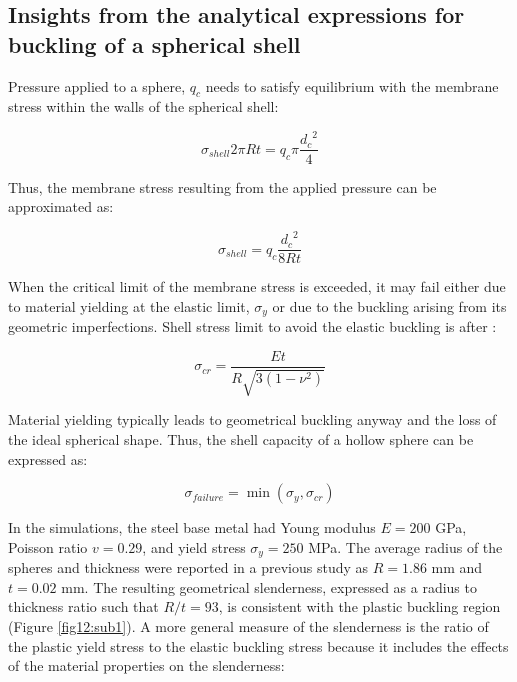 \documentclass[review]{elsarticle}
\begin{document}
{\subsection{Insights from the analytical expressions for buckling of a spherical shell}

Pressure applied to a sphere, $q_c$ needs to satisfy equilibrium with the membrane stress within the walls of the spherical shell:

\begin{equation}\label{Eq1}
\sigma_{shell}2\pi Rt=q_c\pi \frac{{d_c}^{2}}{4}
\end{equation}


Thus, the membrane stress resulting from the applied pressure can be approximated as:

\begin{equation}\label{Eq2}
\sigma_{shell}=q_c\frac{{d_c}^{2}}{8Rt}
\end{equation}

When the critical limit of the membrane stress is exceeded, it may fail either due to material yielding at the elastic limit, $\sigma_y$ or due to the buckling arising from its geometric imperfections. Shell stress limit to avoid the elastic buckling is after \cite{TimGer2009}:

\begin{equation}\label{Eq3}
\sigma_{cr}=\frac{Et}{R\sqrt{3(1-\nu^2)}}
\end{equation}

Material yielding typically leads to geometrical buckling anyway and the loss of the ideal spherical shape. Thus, the shell capacity of a hollow sphere can be expressed as:

\begin{equation}\label{Eq4}
\sigma_{failure}=\min(\sigma_y,\sigma_{cr})
\end{equation}

In the simulations, the steel base metal had Young modulus $E=200$ GPa, Poisson ratio $v=0.29$, and yield stress $\sigma_y=250$ MPa. The average radius of the spheres and thickness were reported in a previous study \cite{Szyniszewskietal2014} as $R = 1.86$ mm and $t = 0.02$ mm. The resulting geometrical slenderness, expressed as a radius to thickness ratio such that $R/t = 93$, is consistent with the plastic buckling region (Figure \ref{fig12:sub1}). A more general measure of the slenderness is the ratio of the plastic yield stress to the elastic buckling stress because it includes the effects of the material properties on the slenderness:

}
\end{document}
